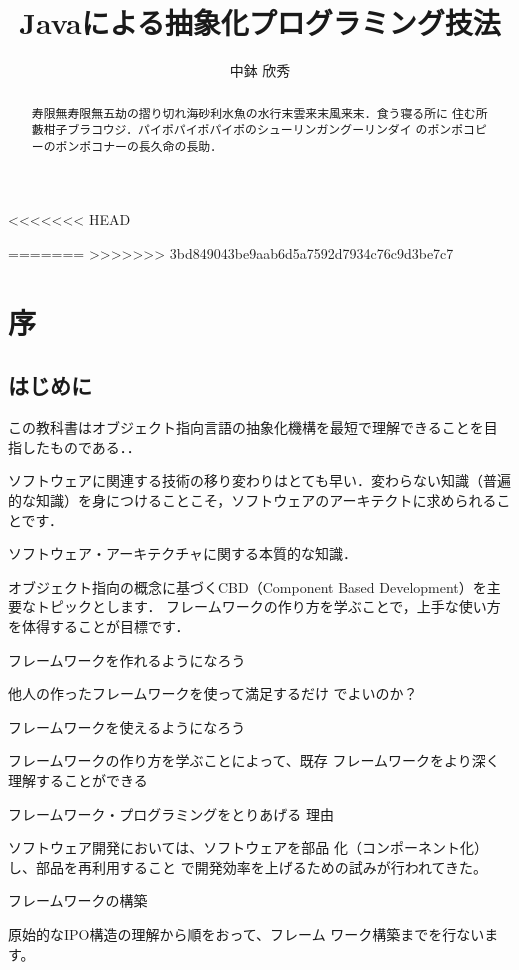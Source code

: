 \documentclass[a4j, twoside]{jsbook}
\title{Javaによる抽象化プログラミング技法}
\author{中鉢 欣秀}
\begin{document}
\maketitle
<<<<<<< HEAD

\setcounter{tocdepth}{4}
\tableofcontents
\listoffigures
=======
\tableofcontents
>>>>>>> 3bd849043be9aab6d5a7592d7934c76c9d3be7c7

\chapter*{序}

\begin{abstract}
寿限無寿限無五劫の摺り切れ海砂利水魚の水行末雲来末風来末．食う寝る所に
住む所藪柑子ブラコウジ．パイポパイポパイポのシューリンガングーリンダイ
のポンポコピーのポンポコナーの長久命の長助．
\end{abstract}

\section*{はじめに}

この教科書はオブジェクト指向言語の抽象化機構を最短で理解できることを目
指したものである．．

ソフトウェアに関連する技術の移り変わりはとても早い．変わらない知識（普遍的な知識）を身につけることこそ，ソフトウェアのアーキテクトに求められることです．

ソフトウェア・アーキテクチャに関する本質的な知識．

オブジェクト指向の概念に基づくCBD（Component Based Development）を主要なトピックとします．
フレームワークの作り方を学ぶことで，上手な使い方を体得することが目標です．

フレームワークを作れるようになろう 

他人の作ったフレームワークを使って満足するだけ
でよいのか？ 

フレームワークを使えるようになろう 

フレームワークの作り方を学ぶことによって、既存
フレームワークをより深く理解することができる 

フレームワーク・プログラミングをとりあげる
理由 

ソフトウェア開発においては、ソフトウェアを部品
化（コンポーネント化）し、部品を再利用すること
で開発効率を上げるための試みが行われてきた。 

フレームワークの構築 

原始的なIPO構造の理解から順をおって、フレーム
ワーク構築までを行ないます。 
\end{document}
